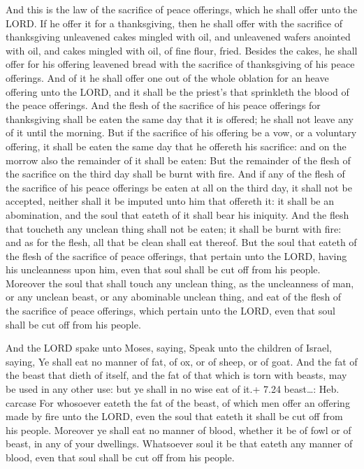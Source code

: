  And this is the law of the sacrifice of peace offerings,
which he shall offer unto the LORD.  If he offer it for a
thanksgiving, then he shall offer with the sacrifice of thanksgiving
unleavened cakes mingled with oil, and unleavened wafers anointed with
oil, and cakes mingled with oil, of fine flour, fried. 
Besides the cakes, he shall offer for his offering leavened bread with
the sacrifice of thanksgiving of his peace offerings.  And
of it he shall offer one out of the whole oblation for an heave offering
unto the LORD, and it shall be the priest's that sprinkleth the blood of
the peace offerings.  And the flesh of the sacrifice of his
peace offerings for thanksgiving shall be eaten the same day that it is
offered; he shall not leave any of it until the morning. 
But if the sacrifice of his offering be a vow, or a voluntary offering,
it shall be eaten the same day that he offereth his sacrifice: and on
the morrow also the remainder of it shall be eaten:  But
the remainder of the flesh of the sacrifice on the third day shall be
burnt with fire.  And if any of the flesh of the sacrifice
of his peace offerings be eaten at all on the third day, it shall not be
accepted, neither shall it be imputed unto him that offereth it: it
shall be an abomination, and the soul that eateth of it shall bear his
iniquity.  And the flesh that toucheth any unclean thing
shall not be eaten; it shall be burnt with fire: and as for the flesh,
all that be clean shall eat thereof.  But the soul that
eateth of the flesh of the sacrifice of peace offerings, that pertain
unto the LORD, having his uncleanness upon him, even that soul shall be
cut off from his people.  Moreover the soul that shall
touch any unclean thing, as the uncleanness of man, or any unclean
beast, or any abominable unclean thing, and eat of the flesh of the
sacrifice of peace offerings, which pertain unto the LORD, even that
soul shall be cut off from his people.

 And the LORD spake unto Moses, saying, 
Speak unto the children of Israel, saying, Ye shall eat no manner of
fat, of ox, or of sheep, or of goat.  And the fat of the
beast that dieth of itself, and the fat of that which is torn with
beasts, may be used in any other use: but ye shall in no wise eat of
it.+ 7.24 beast\ldots: Heb. carcase  For whosoever eateth
the fat of the beast, of which men offer an offering made by fire unto
the LORD, even the soul that eateth it shall be cut off from his people.
 Moreover ye shall eat no manner of blood, whether it be of
fowl or of beast, in any of your dwellings.  Whatsoever
soul it be that eateth any manner of blood, even that soul shall be cut
off from his people.

